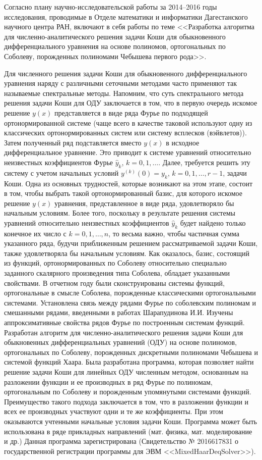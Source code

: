 \Introduction

Согласно плану научно-исследовательской работы за 2014--2016 годы исследования, проводимые в Отделе математики и информатики Дагестанского научного центра РАН, включают в себя работы по теме
<<Разработка алгоритма для численно-аналитического решения задачи Коши для обыкновенного дифференциального уравнения на основе полиномов, ортогональных по Соболеву, порожденных полиномами Чебышева первого рода>>.


Для численного решения задачи Коши для обыкновенного дифференциального уравнения наряду с различными сеточными методами часто применяют так называемые спектральные методы. Напомним, что суть спектрального метода решения задачи Коши  для ОДУ  заключается в том, что в первую очередь искомое решение $y(x)$ представляется в виде ряда Фурье по подходящей ортонормированной системе (чаще всего в качестве таковой используют одну из классических ортонормированных систем или систему  всплесков (вэйвлетов)). Затем полученный ряд подставляется вместо $y(x)$ в исходное дифференциальное уравнение. Это приводит к системе уравнений относительно неизвестных коэффициентов Фурье $\hat y_k$, $k=0,1,\ldots$. Далее, требуется решить эту систему с учетом начальных условий  $y^{(k)}(0)=y_k$, $k=0,1,\ldots,r-1$, задачи Коши. Одна из основных трудностей, которые возникают на этом этапе, состоит в том, чтобы
выбрать такой ортонормированный базис, для которого искомое решение $y(x)$ уравнения, представленное в виде ряда, удовлетворяло бы начальным условиям. Более того, поскольку в результате решения системы уравнений относительно неизвестных коэффициентов $\hat y_k$  будет найдено только конечное их число с $k=0,1,\ldots, n$, то весьма важно, чтобы частичная сумма указанного ряда, будучи приближенным решением рассматриваемой задачи Коши, также удовлетворяла бы начальным условиям. Как оказалось, базис, состоящий из функций, ортонормированных по Соболеву относительно специально заданного скалярного произведения типа Соболева, обладает указанными свойствами. В отчетном году были сконструированы системы функций, ортогональные в смысле Соболева, порожденные классическими ортогональными системами. Установлена связь между рядами Фурье по соболевским полиномам и смешанными рядами, введенными в работах Шарапудинова И.И.
Изучены аппроксимативные свойства рядов Фурье по построенным системам функций. Разработан алгоритм для численно-аналитического решения задачи Коши для обыкновенных дифференциальных уравнений (ОДУ) на основе полиномов, ортогональных по Соболеву, порожденных дискретными полиномами Чебышева и системой функций Хаара.
Была разработана программа, которая позволяет найти решение задачи Коши для линейных ОДУ численным методом, основанным на разложении функции и ее производных в ряд Фурье по полиномам, ортогональным по Соболеву и порожденным упомянутыми системами функций. Преимущество такого подхода заключается в том, что в разложении  функции и всех ее производных участвуют одни и те же коэффициенты. При этом оказываются учтенными начальные условия задачи Коши. Программа может быть использована в ряде прикладных направлений (мат. физика, мат. моделирование и др.) Данная программа зарегистрирована (Свидетельство № 2016617831 о государственной регистрации программы для ЭВМ <<MixedHaarDeqSolver>>).


